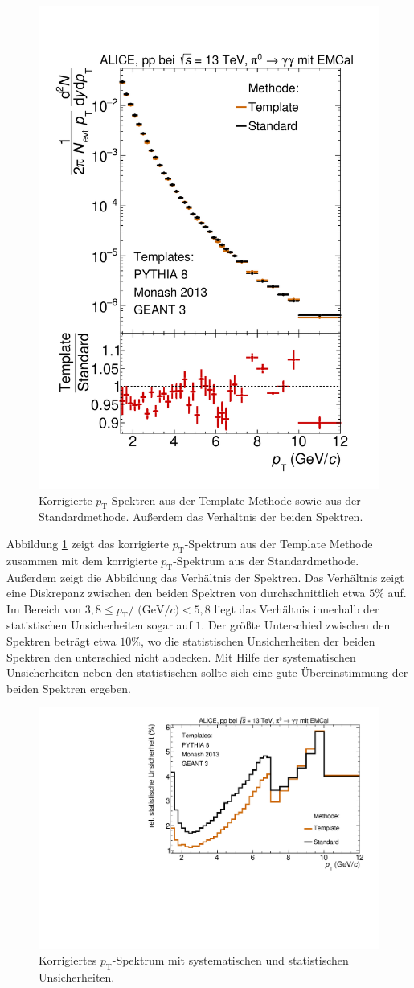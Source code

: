 \begin{figure}[t!]
\centering
\includegraphics[width=.65\linewidth]{KorrigierteYields_Data_2016.pdf}
\caption{Korrigierte $p_\text{T}$-Spektren aus der Template Methode sowie aus der Standardmethode.
Außerdem das Verhältnis der beiden Spektren.}
\label{fig:KorrYieldComp}
\end{figure}
Abbildung \ref{fig:KorrYieldComp} zeigt das korrigierte $p_\text{T}$-Spektrum aus der Template Methode zusammen mit dem korrigierte $p_\text{T}$-Spektrum aus der Standardmethode.
Außerdem zeigt die Abbildung das Verhältnis der Spektren.
Das Verhältnis zeigt eine Diskrepanz zwischen den beiden Spektren von durchschnittlich etwa $5\%$ auf.
Im Bereich von $3,8 \leq p_\text{T}/\text{ (GeV}/c) < 5,8$ liegt das Verhältnis innerhalb der statistischen Unsicherheiten sogar auf $1$.
Der größte Unterschied zwischen den Spektren beträgt etwa $10\%$, wo die statistischen Unsicherheiten der beiden Spektren den unterschied nicht abdecken.
Mit Hilfe der systematischen Unsicherheiten neben den statistischen sollte sich eine gute Übereinstimmung der beiden Spektren ergeben.
\begin{figure}[t!]
\centering
\includegraphics[width=.65\linewidth]{StatistischeUnsicherheitVergleich_Data_2016.pdf}
\caption{Korrigiertes $p_\text{T}$-Spektrum mit systematischen und statistischen Unsicherheiten.}
\label{fig:StatUncer}
\end{figure}
